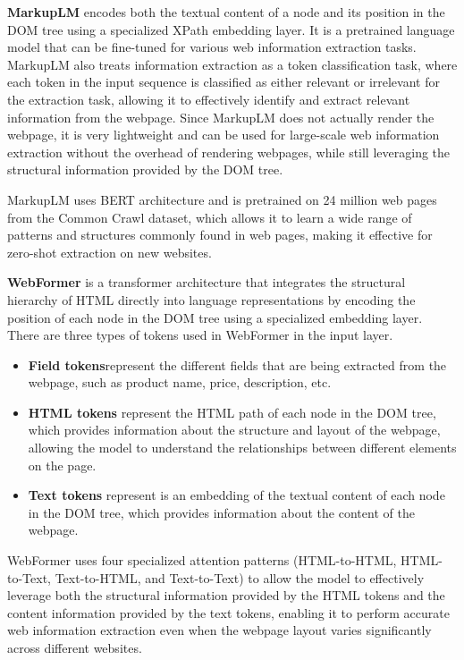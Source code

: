 \textbf{MarkupLM}\cite{li2022markuplm} encodes both the textual content of a node and its position in the DOM tree using a specialized XPath embedding layer.
It is a pretrained language model that can be fine-tuned for various web information extraction tasks.
MarkupLM also treats information extraction as a token classification task, where each token in the input sequence is classified as either relevant or irrelevant for the extraction task, allowing it to effectively identify and extract relevant information from the webpage.
Since MarkupLM does not actually render the webpage, it is very lightweight and can be used for large-scale web information extraction without the overhead of rendering webpages, while still leveraging the structural information provided by the DOM tree.

MarkupLM uses BERT architecture and is pretrained on 24 million web pages from the Common Crawl\cite{common-crawl} dataset, which allows it to learn a wide range of patterns and structures commonly found in web pages, making it effective for zero-shot extraction on new websites.

\textbf{WebFormer}\cite{wang2022webformer} is a transformer architecture that integrates the structural hierarchy of HTML directly into language representations by encoding the position of each node in the DOM tree using a specialized embedding layer.
There are three types of tokens used in WebFormer in the input layer.

\begin{itemize}
    \item \textbf{Field tokens}represent the different fields that are being extracted from the webpage, such as product name, price, description, etc.
    \item \textbf{HTML tokens} represent the HTML path of each node in the DOM tree, which provides information about the structure and layout of the webpage, allowing the model to understand the relationships between different elements on the page.
    \item \textbf{Text tokens} represent is an embedding of the textual content of each node in the DOM tree, which provides information about the content of the webpage.
\end{itemize}

WebFormer uses four specialized attention patterns (HTML-to-HTML, HTML-to-Text, Text-to-HTML, and Text-to-Text) to allow the model to effectively leverage both the structural information provided by the HTML tokens and the content information provided by the text tokens, enabling it to perform accurate web information extraction even when the webpage layout varies significantly across different websites.

